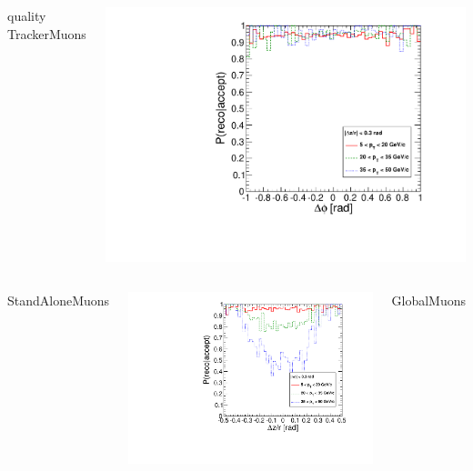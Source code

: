 \documentclass[compress]{beamer}
\begin{document}
\begin{frame}
\begin{columns}
\centering quality TrackerMuons

\includegraphics[width=\linewidth]{barrel_dphi_bypt_TrackerMuon.pdf}
\end{columns}

\begin{columns}
\centering StandAloneMuons

\includegraphics[width=\linewidth]{barrel_dz_bypt_StandAloneMuon.pdf}

\centering GlobalMuons


\end{columns}
\end{frame}
\end{document}
